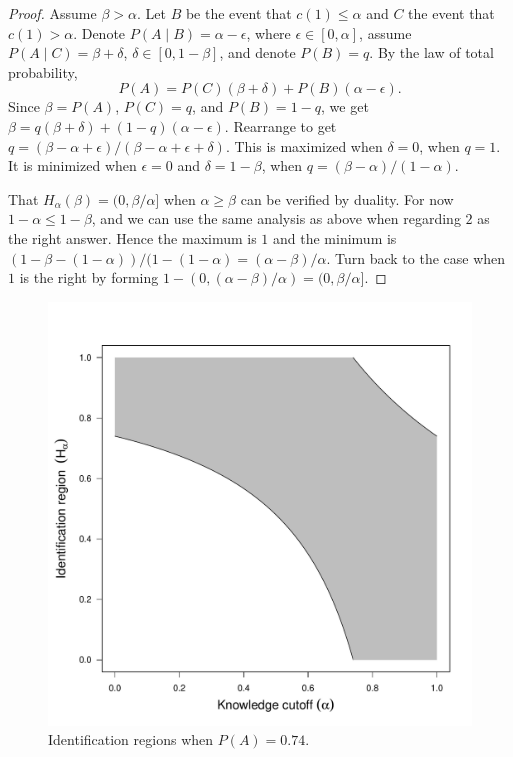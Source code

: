 \begin{proof}
Assume $\beta>\alpha$. Let $B$ be the event that $c(1)\leq\alpha$
and $C$ the event that $c(1)>\alpha$. Denote $P(A\mid B)=\alpha-\epsilon$,
where $\epsilon\in[0,\alpha]$, assume $P(A\mid C)=\beta+\delta$,
$\delta\in[0,1-\beta]$, and denote $P(B)=q$. By the law of total
probability,
\[
P(A)=P(C)(\beta+\delta)+P(B)(\alpha-\epsilon).
\]
Since $\beta=P(A)$, $P(C)=q$, and $P(B)=1-q$, we get $\beta=q(\beta+\delta)+(1-q)(\alpha-\epsilon).$
Rearrange to get $q=(\beta-\alpha+\epsilon)/(\beta-\alpha+\epsilon+\delta)$.
This is maximized when $\delta=0$, when $q=1$. It is minimized when
$\epsilon=0$ and $\delta=1-\beta$, when $q=(\beta-\alpha)/(1-\alpha).$

That $H_\alpha(\beta)=(0,\beta/\alpha]$ when $\alpha\geq\beta$ can be verified by duality. For now $1-\alpha\leq 1-\beta$, and we can use the same analysis as above when regarding $2$ as the right answer. Hence the maximum is $1$ and the minimum is $(1-\beta-(1-\alpha))/(1-(1-\alpha)=(\alpha-\beta)/\alpha$. Turn back to the case when $1$ is the right by forming $1-(0,(\alpha-\beta)/\alpha)=(0,\beta/\alpha].$
\end{proof}
\begin{figure}
\noindent \begin{centering}
\includegraphics[scale=0.5]{chunks/knowing}
\par\end{centering}
\caption{\label{fig:Identification-regions-guessing}Identification regions
when $P(A)=0.74$.}
\end{figure}

